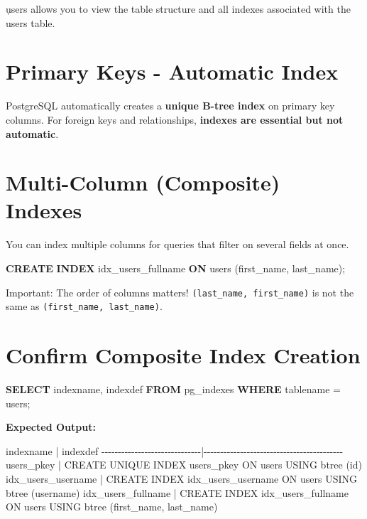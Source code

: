 \documentclass[
]{report}
\newenvironment{Shaded}{\begin{snugshade}}{\end{snugshade}}
\newcommand{\KeywordTok}[1]{\textcolor[rgb]{0.00,0.23,0.31}{\textbf{#1}}}
\newcommand{\NormalTok}[1]{\textcolor[rgb]{0.00,0.23,0.31}{#1}}
\newcommand{\OperatorTok}[1]{\textcolor[rgb]{0.37,0.37,0.37}{#1}}
\newcommand{\StringTok}[1]{\textcolor[rgb]{0.13,0.47,0.30}{#1}}
\begin{document}
\d users allows you to view the table structure and all indexes
associated with the users table.

\section{Primary Keys - Automatic
Index}\label{primary-keys---automatic-index}

PostgreSQL automatically creates a \textbf{unique B-tree index} on
primary key columns. For foreign keys and relationships, \textbf{indexes
are essential but not automatic}.

\section{Multi-Column (Composite)
Indexes}\label{multi-column-composite-indexes}

You can index multiple columns for queries that filter on several fields
at once.

\begin{Shaded}
\begin{Highlighting}[]
\KeywordTok{CREATE} \KeywordTok{INDEX}\NormalTok{ idx\_users\_fullname }
\KeywordTok{ON}\NormalTok{ users (first\_name, last\_name);}
\end{Highlighting}
\end{Shaded}

Important: The order of columns matters!
\texttt{(last\_name,\ first\_name)} is not the same as
\texttt{(first\_name,\ last\_name)}.

\section{Confirm Composite Index
Creation}\label{confirm-composite-index-creation}

\begin{Shaded}
\begin{Highlighting}[]
\KeywordTok{SELECT}\NormalTok{ indexname, indexdef }
\KeywordTok{FROM}\NormalTok{ pg\_indexes }
\KeywordTok{WHERE}\NormalTok{ tablename }\OperatorTok{=} \StringTok{\textquotesingle{}users\textquotesingle{}}\NormalTok{;}
\end{Highlighting}
\end{Shaded}

\textbf{Expected Output:}

\begin{Shaded}
\begin{Highlighting}[]
\NormalTok{indexname                     | indexdef}
\NormalTok{{-}{-}{-}{-}{-}{-}{-}{-}{-}{-}{-}{-}{-}{-}{-}{-}{-}{-}{-}{-}{-}{-}{-}{-}{-}{-}{-}{-}{-}{-}|{-}{-}{-}{-}{-}{-}{-}{-}{-}{-}{-}{-}{-}{-}{-}{-}{-}{-}{-}{-}{-}{-}{-}{-}{-}{-}{-}{-}{-}{-}{-}{-}{-}{-}{-}{-}{-}{-}{-}{-}{-}{-}}
\NormalTok{users\_pkey                    | CREATE UNIQUE INDEX users\_pkey ON users USING btree (id)}
\NormalTok{idx\_users\_username            | CREATE INDEX idx\_users\_username ON users USING btree (username)}
\NormalTok{idx\_users\_fullname            | CREATE INDEX idx\_users\_fullname ON users USING btree (first\_name, last\_name)}
\end{Highlighting}
\end{Shaded}
\end{document}
